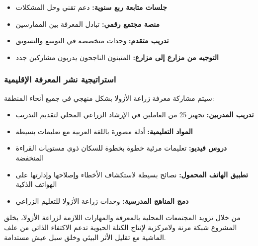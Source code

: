\begin{itemize}
    \item \textbf{جلسات متابعة ربع سنوية:} دعم تقني وحل المشكلات
    \item \textbf{منصة مجتمع رقمي:} تبادل المعرفة بين الممارسين
    \item \textbf{تدريب متقدم:} وحدات متخصصة في التوسع والتسويق
    \item \textbf{التوجيه من مزارع إلى مزارع:} المتبنون الناجحون يدربون مشاركين جدد
\end{itemize}

\subsubsection{استراتيجية نشر المعرفة الإقليمية}

سيتم مشاركة معرفة زراعة الأزولا بشكل منهجي في جميع أنحاء المنطقة:

\begin{itemize}
    \item \textbf{تدريب المدربين:} تجهيز 25 من العاملين في الإرشاد الزراعي المحلي لتقديم التدريب
    \item \textbf{المواد التعليمية:} أدلة مصورة باللغة العربية مع تعليمات بسيطة
    \item \textbf{دروس فيديو:} تعليمات مرئية خطوة بخطوة للسكان ذوي مستويات القراءة المنخفضة
    \item \textbf{تطبيق الهاتف المحمول:} نصائح بسيطة لاستكشاف الأخطاء وإصلاحها وإدارتها على الهواتف الذكية
    \item \textbf{دمج المناهج المدرسية:} وحدات زراعة الأزولا للتعليم الزراعي
\end{itemize}

من خلال تزويد المجتمعات المحلية بالمعرفة والمهارات اللازمة لزراعة الأزولا، يخلق المشروع شبكة مرنة ولامركزية لإنتاج الكتلة الحيوية تدعم الاكتفاء الذاتي من علف الماشية مع تقليل الأثر البيئي وخلق سبل عيش مستدامة.
